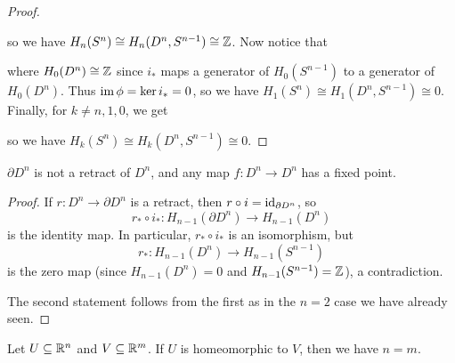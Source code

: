 \begin{proof}
\begin{center}
  \end{center}
  so we have
  $H_n(S^n) \cong H_{n}(D^n, S^{n - 1}) \cong \mathbb{Z}$.
  Now notice that
  \begin{center}
  \end{center}
  where $H_0(D^n) \cong \mathbb{Z}$ since $i_*$ maps a
  generator of $H_0(S^{n - 1})$ to a generator of
  $H_0(D^n)$. Thus $\operatorname{im} \phi = \ker i_* = 0$, so we have
  $H_1(S^n) \cong H_1(D^n, S^{n - 1}) \cong 0$.
  Finally, for $k \ne n, 1, 0$, we get
  \begin{center}
  \end{center}
  so we have $H_k(S^n) \cong H_k(D^n, S^{n - 1}) \cong 0$.
\end{proof}

\begin{corollary}
  $\partial D^n$ is not a retract of $D^n$, and
  any map $f : D^n \to D^n$ has a fixed point.
\end{corollary}

\begin{proof}
  If $r : D^n \to \partial D^n$ is a retract, then
  $r \circ i = \operatorname{id}_{\partial D^n}$, so
  \[
    r_* \circ i_* : H_{n - 1}(\partial D^n) \to H_{n - 1}(D^n)
  \]
  is the identity map. In particular, $r_* \circ i_*$
  is an isomorphism, but
  \[
    r_* : H_{n - 1}(D^n) \to H_{n - 1}(S^{n - 1})
  \]
  is the zero map
  (since $H_{n - 1}(D^n) = 0$ and
  $H_{n - 1}(S^{n - 1}) = \mathbb{Z}$), a contradiction.

  The second statement follows from the first as
  in the $n = 2$ case we have already seen.
\end{proof}

\begin{corollary}
  Let $U \subseteq \mathbb{R}^n$ and $V \subseteq \mathbb{R}^m$.
  If $U$ is homeomorphic to $V$, then we have $n = m$.
\end{corollary}

